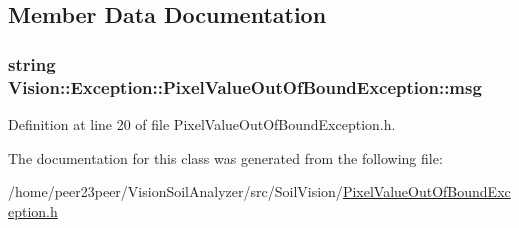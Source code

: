 \subsection{Member Data Documentation}
\hypertarget{class_vision_1_1_exception_1_1_pixel_value_out_of_bound_exception_a5e1cb97c34bdedca34b733d5cf16f8c2}{}
\subsubsection[{msg}]{\setlength{\rightskip}{0pt plus 5cm}string Vision\+::\+Exception\+::\+Pixel\+Value\+Out\+Of\+Bound\+Exception\+::msg\hspace{0.3cm}{\ttfamily [private]}}\label{class_vision_1_1_exception_1_1_pixel_value_out_of_bound_exception_a5e1cb97c34bdedca34b733d5cf16f8c2}


Definition at line 20 of file Pixel\+Value\+Out\+Of\+Bound\+Exception.\+h.



The documentation for this class was generated from the following file\+:\begin{DoxyCompactItemize}
\item 
/home/peer23peer/\+Vision\+Soil\+Analyzer/src/\+Soil\+Vision/\hyperlink{_pixel_value_out_of_bound_exception_8h}{Pixel\+Value\+Out\+Of\+Bound\+Exception.\+h}\end{DoxyCompactItemize}
